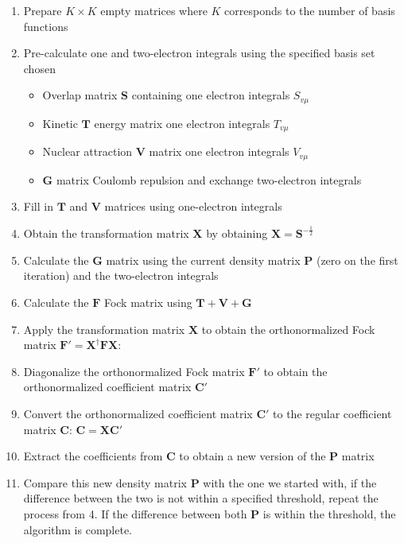 \documentclass[10pt, oneside, letterpaper]{article}
\begin{document}
\begin{enumerate}
    \item Prepare $K \times K$ empty matrices where $K$ corresponds to the number of basis functions
    \item Pre-calculate one and two-electron integrals using the specified basis set chosen
      \begin{itemize}
        \item Overlap matrix $\bm{S}$ containing one electron integrals $S_{v\mu}$
        \item Kinetic $\bm{T}$ energy matrix one electron integrals $T_{v\mu}$
        \item Nuclear attraction $\bm{V}$ matrix one electron integrals $V_{v\mu}$
        \item $\bm{G}$ matrix Coulomb repulsion and exchange two-electron integrals
      \end{itemize}
    \item Fill in $\bm{T}$ and $\bm{V}$ matrices using one-electron integrals
    \item Obtain the transformation matrix $\bm{X}$ by obtaining $\bm{X} = \bm{S}^{-\frac{1}{2}}$
    \item Calculate the $\bm{G}$ matrix using the current density matrix $\bm{P}$ (zero on the first iteration) and the two-electron integrals
    \item Calculate the $\bm{F}$ Fock matrix using $\bm{T} + \bm{V} + \bm{G}$
    \item Apply the transformation matrix $\bm{X}$ to obtain the orthonormalized Fock matrix $\bm{F}' = \bm{X}^\dagger\bm{F}\bm{X}$:
    \item Diagonalize the orthonormalized Fock matrix $\bm{F}'$ to obtain the orthonormalized coefficient matrix $\bm{C}'$
    \item Convert the orthonormalized coefficient matrix $\bm{C}'$ to the regular coefficient matrix $\bm{C}$: $\bm{C} = \bm{X}\bm{C}'$
    \item Extract the coefficients from $\bm{C}$ to obtain a new version of the $\bm{P}$ matrix
    \item Compare this new density matrix $\bm{P}$ with the one we started with, if the difference between the two is not within a specified threshold, repeat the process from 4. If the difference between both $\bm{P}$ is within the threshold, the algorithm is complete.

\end{enumerate}

\newpage
\end{document}
